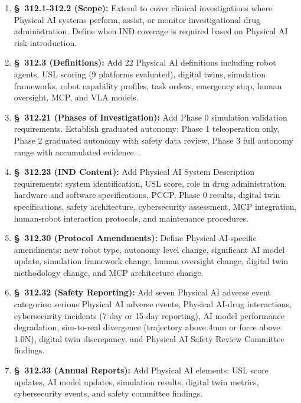 \documentclass[11pt,letterpaper]{article}
\begin{document}
\begin{enumerate}[label=(\alph*)]
\item \textbf{\S~312.1-312.2 (Scope):} Extend to cover clinical investigations
  where Physical AI systems perform, assist, or monitor investigational drug
  administration. Define when IND coverage is required based on Physical AI
  risk introduction.

\item \textbf{\S~312.3 (Definitions):} Add 22 Physical AI definitions
  including robot agents, USL scoring (9 platforms evaluated), digital twins,
  simulation frameworks, robot capability profiles, task orders, emergency
  stop, human oversight, MCP, and VLA models.

\item \textbf{\S~312.21 (Phases of Investigation):} Add Phase 0 simulation
  validation requirements. Establish graduated autonomy: Phase 1 teleoperation
  only, Phase 2 graduated autonomy with safety data review, Phase 3 full
  autonomy range with accumulated evidence~\cite{cfr312adapt}.

\item \textbf{\S~312.23 (IND Content):} Add Physical AI System Description
  requirements: system identification, USL score, role in drug administration,
  hardware and software specifications, PCCP, Phase 0 results, digital twin
  specifications, safety architecture, cybersecurity assessment, MCP
  integration, human-robot interaction protocols, and maintenance procedures.

\item \textbf{\S~312.30 (Protocol Amendments):} Define Physical AI-specific
  amendments: new robot type, autonomy level change, significant AI model
  update, simulation framework change, human oversight change, digital twin
  methodology change, and MCP architecture change.

\item \textbf{\S~312.32 (Safety Reporting):} Add seven Physical AI adverse
  event categories: serious Physical AI adverse events, Physical AI-drug
  interactions, cybersecurity incidents (7-day or 15-day reporting), AI model
  performance degradation, sim-to-real divergence (trajectory above 4mm or
  force above 1.0N), digital twin discrepancy, and Physical AI Safety Review
  Committee findings.

\item \textbf{\S~312.33 (Annual Reports):} Add Physical AI elements: USL
  score updates, AI model updates, simulation results, digital twin metrics,
  cybersecurity events, and safety committee findings.


\end{enumerate}
\end{document}
